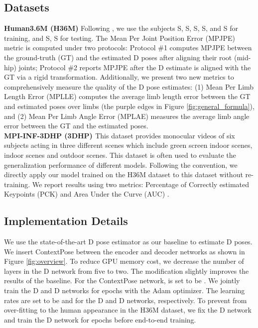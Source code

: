 \label{sec:experiments}
\subsection{Datasets}
\noindent\textbf{Human3.6M (H36M)\cite{h36m_pami}} Following \cite{Ci_2019_ICCV}, we use the subjects S, S, S, S, and S for training, and S, S for testing. The Mean Per Joint Position Error (MPJPE) metric is computed under two protocols: Protocol \#1 computes MPJPE between the ground-truth (GT) and the estimated D poses after aligning their root (mid-hip) joints; Protocol \#2 reports MPJPE after the D estimate is aligned with the GT via a rigid transformation. Additionally, we present two new metrics to comprehensively measure the quality of the D pose estimates: (1) Mean Per Limb Length Error (MPLLE) computes the average limb length error between the GT and estimated poses over  limbs (\ie the purple edges in Figure \ref{fig:general_formula}), and (2) Mean Per Limb Angle Error (MPLAE) measures the average limb angle error between the GT and the estimated poses.\\


\noindent\textbf{MPI-INF-3DHP (3DHP) \cite{mehta2017monocular}} This dataset provides monocular videos of six subjects acting in three different scenes which include green screen indoor scenes, indoor scenes and outdoor scenes. This dataset is often used to evaluate the generalization performance of different models. Following the convention, we directly apply our model trained on the H36M dataset to this dataset without re-training. We report results using two metrics: Percentage of Correctly estimated Keypoints (PCK) \cite{andriluka14cvpr} and Area Under the Curve (AUC) \cite{mehta2017monocular}. 

\subsection{Implementation Details}
\label{sec:implementation}
We use the state-of-the-art D pose estimator \cite{Iskakov_2019_ICCV} as our baseline to estimate D poses. We insert ContextPose between the encoder and decoder networks as shown in Figure \ref{fig:overview}. To reduce GPU memory cost, we decrease the number of layers in the D network from five to two. The modification slightly improves the results of the baseline. For the ContextPose network,  is set to be . We jointly train the D and D networks for  epochs with the Adam \cite{kingma2015adam} optimizer. 
The learning rates are set to be   and  for the D and D networks, respectively. To prevent from over-fitting to the human appearance in the H36M dataset, we fix the D network and train the D network for  epochs before end-to-end training.




